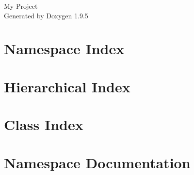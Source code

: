 \documentclass[twoside]{book}
\newcommand{\+}{\discretionary{\mbox{\scriptsize$\hookleftarrow$}}{}{}}
\newcommand{\clearemptydoublepage}{%
    \newpage{\pagestyle{empty}\cleardoublepage}%
  }
\begin{document}
  \raggedbottom
    \hypersetup{pageanchor=false,
                bookmarksnumbered=true,
                pdfencoding=unicode
               }
  \begin{titlepage}
  \vspace*{7cm}
  \begin{center}%
  {\Large My Project}\\
  \vspace*{1cm}
  {\large Generated by Doxygen 1.9.5}\\
  \end{center}
  \end{titlepage}
  \clearemptydoublepage
  \tableofcontents
  \clearemptydoublepage
  \hypersetup{pageanchor=true}
\chapter{Namespace Index}

\chapter{Hierarchical Index}

\chapter{Class Index}

\chapter{Namespace Documentation}













\end{document}
